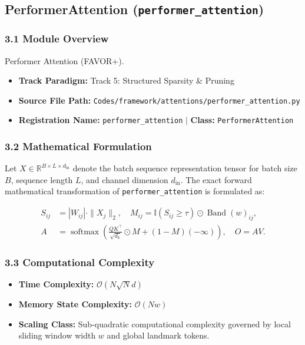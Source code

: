 \subsection{PerformerAttention (\texttt{performer\_attention})}
\label{sec:app_module_performer_attention}

\subsubsection*{3.1 Module Overview}
Performer Attention (FAVOR+).
\begin{itemize}
    \item \textbf{Track Paradigm:} Track 5: Structured Sparsity \& Pruning
    \item \textbf{Source File Path:} \texttt{Codes/framework/attentions/performer\_attention.py}
    \item \textbf{Registration Name:} \texttt{performer\_attention} $\mid$ \textbf{Class:} \texttt{PerformerAttention}
\end{itemize}

\subsubsection*{3.2 Mathematical Formulation}
Let $X \in \mathbb{R}^{B \times L \times d_{\text{in}}}$ denote the batch sequence representation tensor for batch size $B$, sequence length $L$, and channel dimension $d_{\text{in}}$. The exact forward mathematical transformation of \texttt{performer\_attention} is formulated as:

\begin{align}
S_{ij} &= |W_{ij}| \cdot \|X_j\|_2, \quad M_{ij} = \mathbb{I}(S_{ij} \ge \tau) \odot \operatorname{Band}(w)_{ij}, \\
A &= \operatorname{softmax}\left(\frac{Q K^\top}{\sqrt{d_k}} \odot M + (1 - M)(-\infty)\right), \quad O = A V.
\end{align}


\subsubsection*{3.3 Computational Complexity}
\begin{itemize}
    \item \textbf{Time Complexity:} $\mathcal{O}(N \sqrt{N} d)$
    \item \textbf{Memory State Complexity:} $\mathcal{O}(N w)$
    \item \textbf{Scaling Class:} Sub-quadratic computational complexity governed by local sliding window width $w$ and global landmark tokens.
\end{itemize}

